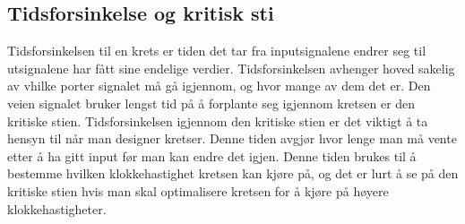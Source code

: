   \subsection{Tidsforsinkelse og kritisk sti}
    Tidsforsinkelsen til en krets er tiden det tar fra inputsignalene endrer seg til utsignalene har fått sine endelige verdier.
    Tidsforsinkelsen avhenger hoved sakelig av vhilke porter signalet må gå igjennom, og hvor mange av dem det er.
    Den veien signalet bruker lengst tid på å forplante seg igjennom kretsen er den kritiske stien.
    Tidsforsinkelsen igjennom den kritiske stien er det viktigt å ta hensyn til når man designer kretser. Denne tiden avgjør hvor lenge man må vente etter å ha gitt input før man kan endre det igjen. Denne tiden brukes til å bestemme hvilken klokkehastighet kretsen kan kjøre på, og det er lurt å se på den kritiske stien hvis man skal optimalisere kretsen for å kjøre på høyere klokkehastigheter.
